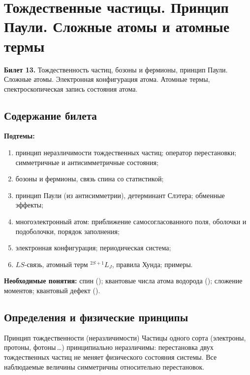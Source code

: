 \chapter[Тождественные частицы. Принцип Паули. Сложные атомы. Термы]%
        {Тождественные частицы. Принцип Паули. Сложные атомы и атомные термы}
\label{t:13}

\begin{qbox}
\textbf{Билет 13.} Тождественность частиц, бозоны и фермионы, принцип Паули. Сложные атомы.
Электронная конфигурация атома. Атомные термы, спектроскопическая запись состояния атома.
\end{qbox}

\section{Содержание билета}

\textbf{Подтемы:}
\begin{enumerate}
 \item принцип неразличимости тождественных частиц; оператор перестановки; симметричные и антисимметричные состояния;
 \item бозоны и фермионы, связь спина со статистикой;
 \item принцип Паули (из антисимметрии), детерминант Слэтера; обменные эффекты;
 \item многоэлектронный атом: приближение самосогласованного поля, оболочки и подоболочки, порядок заполнения;
 \item электронная конфигурация; периодическая система;
 \item $LS$-связь, атомный терм $^{2S+1}L_J$, правила Хунда; примеры.
\end{enumerate}

\textbf{Необходимые понятия:} спин (); квантовые числа атома водорода ();
сложение моментов; квантовый дефект ().

\section{Определения и физические принципы}

\begin{principle}{Принцип тождественности (неразличимости)}
Частицы одного сорта (электроны, протоны, фотоны\,\dots) принципиально неразличимы: перестановка двух
тождественных частиц не меняет физического состояния системы. Все наблюдаемые величины симметричны
относительно перестановок.
\end{principle}

